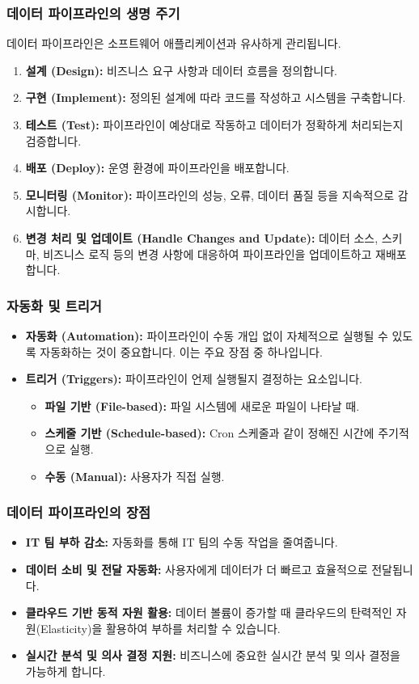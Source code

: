 \documentclass[11pt,a4paper]{article}
\begin{document}
\subsubsection{데이터 파이프라인의 생명 주기}
데이터 파이프라인은 소프트웨어 애플리케이션과 유사하게 관리됩니다.
\begin{enumerate}
    \item \textbf{설계 (Design):} 비즈니스 요구 사항과 데이터 흐름을 정의합니다.
    \item \textbf{구현 (Implement):} 정의된 설계에 따라 코드를 작성하고 시스템을 구축합니다.
    \item \textbf{테스트 (Test):} 파이프라인이 예상대로 작동하고 데이터가 정확하게 처리되는지 검증합니다.
    \item \textbf{배포 (Deploy):} 운영 환경에 파이프라인을 배포합니다.
    \item \textbf{모니터링 (Monitor):} 파이프라인의 성능, 오류, 데이터 품질 등을 지속적으로 감시합니다.
    \item \textbf{변경 처리 및 업데이트 (Handle Changes and Update):} 데이터 소스, 스키마, 비즈니스 로직 등의 변경 사항에 대응하여 파이프라인을 업데이트하고 재배포합니다.
\end{enumerate}

\subsubsection{자동화 및 트리거}
\begin{itemize}
    \item \textbf{자동화 (Automation):} 파이프라인이 수동 개입 없이 자체적으로 실행될 수 있도록 자동화하는 것이 중요합니다. 이는 주요 장점 중 하나입니다.
    \item \textbf{트리거 (Triggers):} 파이프라인이 언제 실행될지 결정하는 요소입니다.
    \begin{itemize}
        \item \textbf{파일 기반 (File-based):} 파일 시스템에 새로운 파일이 나타날 때.
        \item \textbf{스케줄 기반 (Schedule-based):} Cron 스케줄과 같이 정해진 시간에 주기적으로 실행.
        \item \textbf{수동 (Manual):} 사용자가 직접 실행.
    \end{itemize}
\end{itemize}

\subsubsection{데이터 파이프라인의 장점}
\begin{itemize}
    \item \textbf{IT 팀 부하 감소:} 자동화를 통해 IT 팀의 수동 작업을 줄여줍니다.
    \item \textbf{데이터 소비 및 전달 자동화:} 사용자에게 데이터가 더 빠르고 효율적으로 전달됩니다.
    \item \textbf{클라우드 기반 동적 자원 활용:} 데이터 볼륨이 증가할 때 클라우드의 탄력적인 자원(Elasticity)을 활용하여 부하를 처리할 수 있습니다.
    \item \textbf{실시간 분석 및 의사 결정 지원:} 비즈니스에 중요한 실시간 분석 및 의사 결정을 가능하게 합니다.
\end{itemize}
\end{document}
